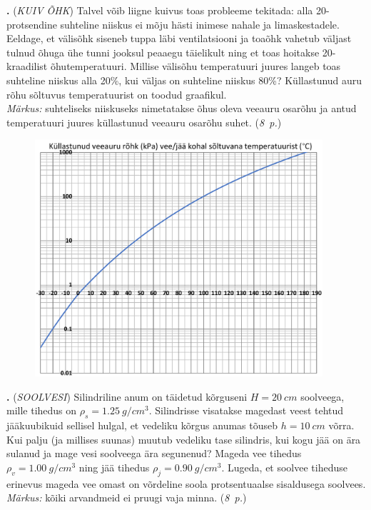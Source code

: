 \documentclass[11pt,a5paper]{article}
\newcommand{\numb}[1]{\vspace{5pt}\textbf{\large #1}}
\newcommand{\nimi}[1]{(\textsl{\small #1})}
\newcommand{\punktid}[1]{(\emph{#1~p.})}
\newcounter{ylesanne}
\newcommand{\yl}[1]{\addtocounter{ylesanne}{1}\numb{\theylesanne.} \nimi{#1} \newblock{}}
\newcommand{\autor}[1]{}%
\begin{document}
\newpage
\yl{KUIV ÕHK}
Talvel võib liigne kuivus toas probleeme tekitada: alla 20-protsendine suhteline niiskus ei mõju hästi inimese nahale ja limaskestadele. Eeldage, et välisõhk siseneb tuppa läbi ventilatsiooni ja toaõhk vahetub väljast tulnud õhuga ühe tunni jooksul peaaegu täielikult ning et toas hoitakse 20-kraadilist õhutemperatuuri. Millise välisõhu temperatuuri juures langeb toas suhteline niiskus alla 20\%, kui väljas on suhteline niiskus 80\%? Küllastunud auru rõhu sõltuvus temperatuurist on toodud graafikul.\\
\emph{Märkus:} suhteliseks niiskuseks nimetatakse õhus oleva veeauru osarõhu ja antud temperatuuri juures küllastunud veeauru osarõhu suhet.
\punktid{8} \autor{Jaan Kalda}

\begin{figure}[h]
  \vspace{-1em}
  \centering
  \includegraphics[width=0.95\textwidth]{veeaur.pdf}
  \vspace{-1em}
\end{figure}

\yl{SOOLVESI}
Silindriline anum on täidetud kõrguseni $H=\SI{20}{cm}$ soolveega, mille tihedus on $\rho_s=\SI{1.25}{g/cm^3}$. Silindrisse visatakse magedast veest tehtud jääkuubikuid sellisel hulgal, et vedeliku kõrgus anumas tõuseb $h=\SI{10}{cm}$ võrra. Kui palju (ja millises suunas) muutub vedeliku tase silindris, kui kogu jää on ära sulanud ja mage vesi soolveega ära segunenud? Mageda vee tihedus  $\rho_v=\SI{1.00}{g/cm^3}$ ning jää tihedus  $\rho_j=\SI{0.90}{g/cm^3}$. Lugeda, et soolvee tiheduse erinevus mageda vee omast on võrdeline soola protsentuaalse sisaldusega soolvees. \\
\emph{Märkus:} kõiki arvandmeid ei pruugi vaja minna.
\punktid{8} \autor{Jaan Kalda}
\end{document}
